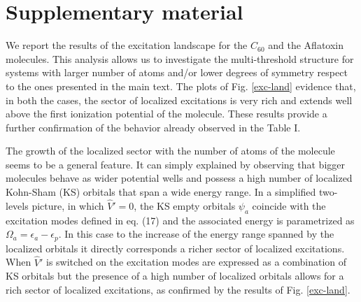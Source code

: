 \documentclass[11pt,a4paper]{article}
\newcommand{\op}[1]{\hat {#1}}
\begin{document}


\section*{Supplementary material}

We report the results of the excitation landscape for the $C_{60}$ and the Aflatoxin molecules. This analysis allows us to investigate the multi-threshold structure for systems with larger number of atoms and/or lower degrees of symmetry respect to the ones presented in the main text. The plots of Fig. \ref{exc-land} evidence that, in both the cases, the sector of localized excitations is very rich and extends well above the first ionization potential of the molecule. These results provide a further confirmation of the behavior already observed in the Table I. 

The growth of the localized sector with the number of atoms of the molecule seems to be a general feature. It can simply explained by observing that bigger molecules behave as wider potential wells and possess a high number of localized Kohn-Sham (KS) orbitals that span a wide energy range. In a simplified two-levels picture, in which $\op V'=0$, the KS empty orbitals $\psi_a$ coincide with the excitation modes defined in eq. (17) and the associated energy is parametrized as $\Omega_a=\epsilon_a-\epsilon_p$. In this case to the increase of the energy range spanned by the localized orbitals it directly corresponds a richer sector of localized excitations.
When $\op V'$ is switched on the excitation modes are expressed as a combination of KS orbitals but the presence of a high number of localized orbitals allows for a rich sector of localized excitations, as confirmed by the results of Fig. \ref{exc-land}.  
\end{document}
